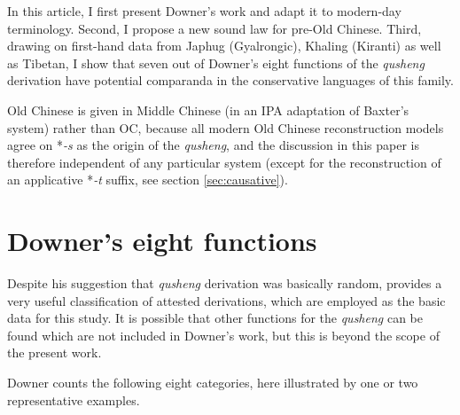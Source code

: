 \documentclass[oneside,a4paper,11pt]{article}
\newcommand{\ipa}[1]{{\phon\textit{\mbox{#1}}}}
\begin{document}
In this article, I first present Downer's work and adapt it to modern-day terminology. Second, I propose a new sound law for pre-Old Chinese. Third, drawing on first-hand data from Japhug (Gyalrongic), Khaling (Kiranti) as well as Tibetan, I show that seven out of Downer's eight functions of the \textit{qusheng} derivation have potential comparanda in the conservative languages of this family.

Old Chinese is given in Middle Chinese (in an IPA adaptation of Baxter's \citeyear{baxter92} system) rather than OC, because all modern Old Chinese reconstruction models agree on *\ipa{-s} as the origin of the \textit{qusheng}, and the discussion in this paper is therefore independent of any particular system (except for the reconstruction of an applicative *\ipa{-t} suffix, see section \ref{sec:causative}).

\section{Downer's eight functions}
Despite his suggestion that \textit{qusheng} derivation was basically random, \citet{downer59} provides a very useful classification of attested derivations, which are employed as the basic data for this study. It is possible that other functions for the \textit{qusheng} can be found which are not included in Downer's work, but this is beyond the scope of the present work.

Downer counts the following eight categories, here illustrated by one or two representative examples.
\end{document}
